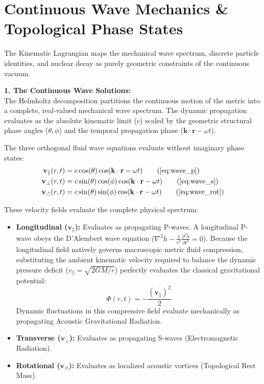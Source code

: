 \documentclass[11pt, a4paper]{article}
\begin{document}
\section{Continuous Wave Mechanics \& Topological Phase States}
\label{sec:deriv_wave_mechanics}

The Kinematic Lagrangian maps the mechanical wave spectrum, discrete particle identities, and nuclear decay as purely geometric constraints of the continuous vacuum.

\textbf{1. The Continuous Wave Solutions:} \\
The Helmholtz decomposition partitions the continuous motion of the metric into a complete, real-valued mechanical wave spectrum. The dynamic propagation evaluates as the absolute kinematic limit ($c$) scaled by the geometric structural phase angles ($\theta, \phi$) and the temporal propagation phase ($\mathbf{k} \cdot \mathbf{r} - \omega t$).

The three orthogonal fluid wave equations evaluate without imaginary phase states:
\begin{align}
    \mathbf{v}_{\parallel}(r,t) &= c \cos(\theta) \cos(\mathbf{k} \cdot \mathbf{r} - \omega t) \tag{\ref{eq:wave_p}} \\
    \mathbf{v}_{\perp}(r,t) &= c \sin(\theta)\cos(\phi) \cos(\mathbf{k} \cdot \mathbf{r} - \omega t) \tag{\ref{eq:wave_s}} \\
    \mathbf{v}_{\circlearrowleft}(r,t) &= c \sin(\theta)\sin(\phi) \cos(\mathbf{k} \cdot \mathbf{r} - \omega t) \tag{\ref{eq:wave_rot}}
\end{align}

These velocity fields evaluate the complete physical spectrum:
\begin{itemize}
    \item \textbf{Longitudinal ($\mathbf{v}_{\parallel}$):} Evaluates as propagating P-waves. A longitudinal P-wave obeys the D'Alembert wave equation ($\nabla^2 h - \frac{1}{c^2} \frac{\partial^2 h}{\partial t^2} = 0$). Because the longitudinal field natively governs macroscopic metric fluid compression, substituting the ambient kinematic velocity required to balance the dynamic pressure deficit ($v_{\parallel} = \sqrt{2GM/r}$) perfectly evaluates the classical gravitational potential:
    \begin{equation}
        \Phi(r,t) = - \frac{(\mathbf{v}_{\parallel})^2}{2} \label{eq:p_wave_potential}
    \end{equation}
    Dynamic fluctuations in this compressive field evaluate mechanically as propagating Acoustic Gravitational Radiation.
    \item \textbf{Transverse ($\mathbf{v}_{\perp}$):} Evaluates as propagating S-waves (Electromagnetic Radiation).
    \item \textbf{Rotational ($\mathbf{v}_{\circlearrowleft}$):} Evaluates as localized acoustic vortices (Topological Rest Mass).
\end{itemize}
\end{document}
